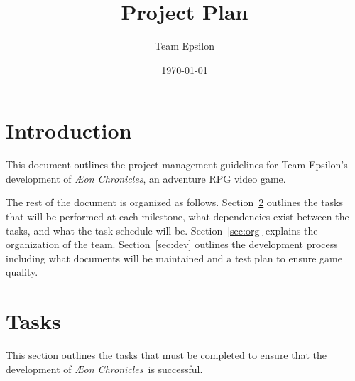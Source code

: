 \documentclass[12pt,titlepage]{article}
\title{Project Plan}
\author{Team Epsilon}
\date{\today}
\newcommand\gametitle{\textit{\AE on Chronicles}}
\begin{document}
\maketitle

\section{Introduction}

This document outlines the project management guidelines for Team Epsilon's
development of \gametitle, an adventure RPG video game.

The rest of the document is organized as follows. Section~\ref{sec:tasks}
outlines the tasks that will be performed at each milestone, what dependencies
exist between the tasks, and what the task schedule will be.
Section~\ref{sec:org} explains the organization of the team.
Section~\ref{sec:dev} outlines the development process including what documents
will be maintained and a test plan to ensure game quality.

\section{Tasks}
\label{sec:tasks}
This section outlines the tasks that must be completed to ensure that the
development of \gametitle\ is successful.
\end{document}
